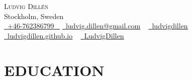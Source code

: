\documentclass[letterpaper,11pt]{article}
\begin{document}


\begin{center}
    {\Huge \scshape Ludvig Dillén} \\ \vspace{1pt}
    Stockholm, Sweden \\ \vspace{1pt}
    \small \href{tel:+46-762386799}{ \raisebox{-0.1\height}\faPhone\ \underline{+46-762386799} ~} \href{mailto:ludvig.dillen@gmail.com}{\raisebox{-0.2\height}\faEnvelope\  \underline{ludvig.dillen@gmail.com}} ~
    \href{https://www.linkedin.com/in/ludvig-dill\%C3\%A9n-4161841a2/}{\raisebox{-0.2\height}\faLinkedinSquare\ \underline{ludvigdillen}} ~
    \href{https://ludvigdillen.github.io/}{\raisebox{-0.2\height}\faGlobe\ \underline{ludvigdillen.github.io}} ~
    \href{https://github.com/LudvigDillen}{\raisebox{-0.2\height}\faGithub\ \underline{LudvigDillen}}
    \vspace{-8pt}
\end{center}


\section{EDUCATION}
\end{document}
